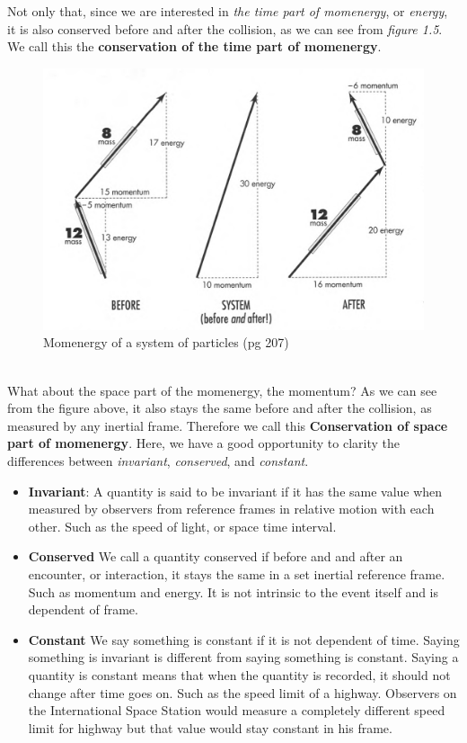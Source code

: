 \documentclass[12pt]{book}
\begin{document}
Not only that, since we are interested in \textit{the time part of momenergy}, or \textit{energy}, it is also conserved before and after the collision, as we can see from \textit{figure 1.5}. We call this the \textbf{conservation of the time part of momenergy}.
\begin{figure}[t]
    \centering
    \includegraphics[width=0.5\linewidth]{picture/Momenergy of a system of particles.png}
    \caption{Momenergy of a system of particles (pg 207)}
    \label{fig:pg207}
\end{figure}\\
\newline
What about the space part of the momenergy, the momentum? As we can see from the figure above, it also stays the same before and after the collision, as measured by any inertial frame. Therefore we call this \textbf{Conservation of space part of momenergy}.
\newline
Here, we have a good opportunity to clarity the differences between \textit{invariant}, \textit{conserved}, and \textit{constant}. 
\begin{itemize}
    \item \textbf{Invariant}: A quantity is said to be invariant if it has the same value when measured by observers from reference frames in relative motion with each other. Such as the speed of light, or space time interval.
    \item \textbf{Conserved} We call a quantity conserved if before and and after an encounter, or interaction, it stays the same in a set inertial reference frame. Such as momentum and energy. It is not intrinsic to the event itself and is dependent of frame. 
    \item \textbf{Constant} We say something is constant if it is not dependent of time. Saying something is invariant is different from saying something is constant. Saying a quantity is constant means that when the quantity is recorded, it should not change after time goes on. Such as the speed limit of a highway. Observers on the International Space Station would measure a completely different speed limit for highway but that value would stay constant in his frame. 
\end{itemize}
\end{document}
